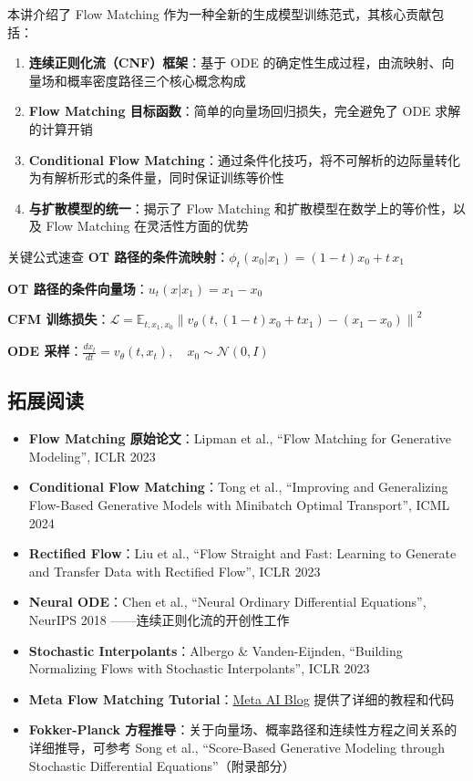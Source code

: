 \documentclass[a4paper]{article}
\begin{document}
本讲介绍了 Flow Matching 作为一种全新的生成模型训练范式，其核心贡献包括：

\begin{enumerate}
    \item \textbf{连续正则化流（CNF）框架}：基于 ODE 的确定性生成过程，由流映射、向量场和概率密度路径三个核心概念构成
    \item \textbf{Flow Matching 目标函数}：简单的向量场回归损失，完全避免了 ODE 求解的计算开销
    \item \textbf{Conditional Flow Matching}：通过条件化技巧，将不可解析的边际量转化为有解析形式的条件量，同时保证训练等价性
    \item \textbf{与扩散模型的统一}：揭示了 Flow Matching 和扩散模型在数学上的等价性，以及 Flow Matching 在灵活性方面的优势
\end{enumerate}

\begin{importantbox}{关键公式速查}
\textbf{OT 路径的条件流映射}：$\phi_t(x_0 | x_1) = (1 - t)x_0 + t \, x_1$

\textbf{OT 路径的条件向量场}：$u_t(x | x_1) = x_1 - x_0$

\textbf{CFM 训练损失}：$\mathcal{L} = \mathbb{E}_{t, x_1, x_0} \left\| v_\theta(t, (1-t)x_0 + tx_1) - (x_1 - x_0) \right\|^2$

\textbf{ODE 采样}：$\frac{dx_t}{dt} = v_\theta(t, x_t), \quad x_0 \sim \mathcal{N}(0, I)$
\end{importantbox}

\subsection{拓展阅读}

\begin{itemize}
    \item \textbf{Flow Matching 原始论文}：Lipman et al., ``Flow Matching for Generative Modeling'', ICLR 2023
    \item \textbf{Conditional Flow Matching}：Tong et al., ``Improving and Generalizing Flow-Based Generative Models with Minibatch Optimal Transport'', ICML 2024
    \item \textbf{Rectified Flow}：Liu et al., ``Flow Straight and Fast: Learning to Generate and Transfer Data with Rectified Flow'', ICLR 2023
    \item \textbf{Neural ODE}：Chen et al., ``Neural Ordinary Differential Equations'', NeurIPS 2018 ——连续正则化流的开创性工作
    \item \textbf{Stochastic Interpolants}：Albergo \& Vanden-Eijnden, ``Building Normalizing Flows with Stochastic Interpolants'', ICLR 2023
    \item \textbf{Meta Flow Matching Tutorial}：\href{https://ai.meta.com/blog/flow-matching-guide-generative-ai/}{Meta AI Blog} 提供了详细的教程和代码
    \item \textbf{Fokker-Planck 方程推导}：关于向量场、概率路径和连续性方程之间关系的详细推导，可参考 Song et al., ``Score-Based Generative Modeling through Stochastic Differential Equations''（附录部分）
\end{itemize}

\end{document}
